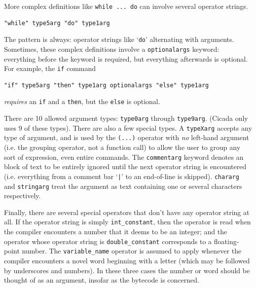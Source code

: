 \documentclass{article}
\newenvironment{code}{
       \begin{list}{}{
               \setlength{\leftmargin}{.4in}
               \setlength{\rightmargin}{0in}
               \setlength{\topsep}{.2in}
       }
       \small
       \item[] }
       { \end{list}   }
\begin{document}
More complex definitions like \verb#while ... do# can involve several operator strings.

\begin{code} \begin{verbatim}
"while" type5arg "do" type1arg
\end{verbatim} \end{code}

\noindent The pattern is always:  operator strings like `\verb#do#' alternating with arguments.  Sometimes, these complex definitions involve a \verb#optionalargs# keyword:  everything before the keyword is required, but everything afterwards is optional.  For example, the \verb#if# command

\begin{code} \begin{verbatim}
"if" type5arg "then" type1arg optionalargs "else" type1arg
\end{verbatim} \end{code}

\noindent \emph{requires} an \verb#if# and a \verb#then#, but the \verb#else# is optional.

There are 10 allowed argument types:  \verb#type0arg# through \verb#type9arg#.  (Cicada only uses 9 of these types).  There are also a few special types.  A \verb#typeXarg# accepts any type of argument, and is used by the \verb#(...)# operator with \emph{no} left-hand argument (i.e. the grouping operator, not a function call) to allow the user to group any sort of expression, even entire commands.  The \verb#commentarg# keyword denotes an block of text to be entirely ignored until the next operator string is encountered (i.e. everything from a comment bar `\verb#|#' to an end-of-line is skipped).  \verb#chararg# and \verb#stringarg# treat the argument as text containing one or several characters respectively.

Finally, there are several special operators that don't have any operator string at all.  If the operator string is simply \verb#int_constant#, then the operator is read when the compiler encounters a number that it deems to be an integer; and the operator whose operator string is \verb#double_constant# corresponds to a floating-point number.  The \verb#variable_name# operator is assumed to apply whenever the compiler encounters a novel word beginning with a letter (which may be followed by underscores and numbers).  In these three cases the number or word should be thought of as an argument, insofar as the bytecode is concerned.
\end{document}
